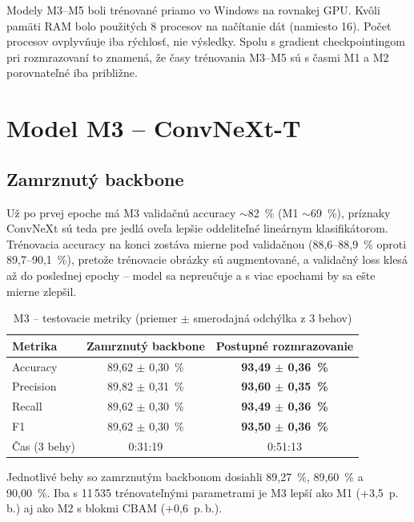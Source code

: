 Modely M3--M5 boli trénované priamo vo Windows na rovnakej GPU. Kvôli
pamäti RAM bolo použitých 8 procesov na načítanie dát (namiesto 16). Počet
procesov ovplyvňuje iba rýchlosť, nie výsledky. Spolu s gradient
checkpointingom pri rozmrazovaní to znamená, že časy trénovania M3--M5 sú
s časmi M1 a M2 porovnateľné iba približne.

\section{Model M3 -- ConvNeXt-T}
\label{sec:m3}

\subsection{Zamrznutý backbone}


Už po prvej epoche má M3 validačnú accuracy $\sim$82~\% (M1 $\sim$69~\%),
príznaky ConvNeXt sú teda pre jedlá oveľa lepšie oddeliteľné lineárnym
klasifikátorom. Trénovacia accuracy na konci zostáva mierne pod validačnou
(88,6--88,9~\% oproti 89,7--90,1~\%), pretože trénovacie obrázky sú
augmentované, a validačný loss klesá až do poslednej epochy -- model sa
nepreučuje a s viac epochami by sa ešte mierne zlepšil.

\begin{table}[H]
    \centering
    \caption{M3 -- testovacie metriky (priemer $\pm$ smerodajná odchýlka z 3 behov)}
    \label{tab:m3-metrics}
    \begin{tabular}{lcc}
        \toprule
        Metrika & Zamrznutý backbone & Postupné rozmrazovanie \\
        \midrule
        Accuracy  & 89,62 $\pm$ 0,30~\% & \textbf{93,49 $\pm$ 0,36~\%} \\
        Precision & 89,82 $\pm$ 0,31~\% & \textbf{93,60 $\pm$ 0,35~\%} \\
        Recall    & 89,62 $\pm$ 0,30~\% & \textbf{93,49 $\pm$ 0,36~\%} \\
        F1        & 89,62 $\pm$ 0,30~\% & \textbf{93,50 $\pm$ 0,36~\%} \\
        Čas (3 behy) & 0:31:19 & 0:51:13 \\
        \bottomrule
    \end{tabular}
\end{table}

Jednotlivé behy so zamrznutým backbonom dosiahli 89,27~\%, 89,60~\%
a 90,00~\%. Iba s 11\,535 trénovateľnými parametrami je M3 lepší ako M1
(+3,5~p.\,b.) aj ako M2 s blokmi CBAM (+0,6~p.\,b.).

